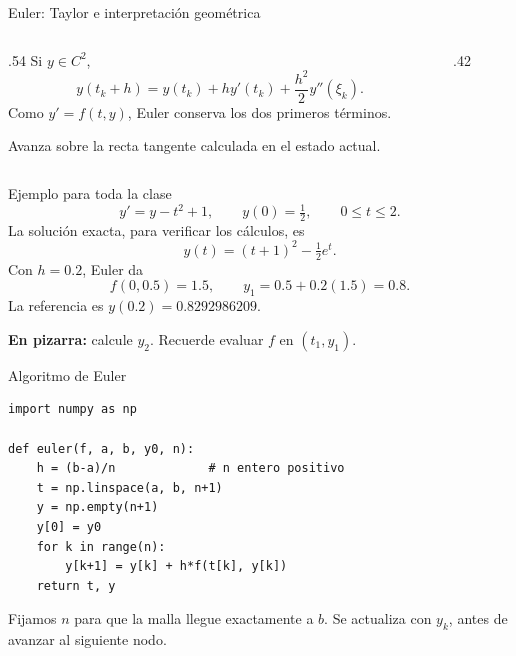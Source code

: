 \documentclass[aspectratio=169,12pt]{beamer}
\begin{document}
\begin{frame}{Euler: Taylor e interpretación geométrica}
\begin{columns}[c,onlytextwidth]
\begin{column}{.54\textwidth}
Si $y\in C^2$,
\[y(t_k+h)=y(t_k)+hy'(t_k)
+\frac{h^2}{2}y''(\xi_k).\]
Como $y'=f(t,y)$, Euler conserva los dos primeros términos.
\medskip

Avanza sobre la recta tangente calculada en el estado actual.
\end{column}
\begin{column}{.42\textwidth}
\end{column}
\end{columns}
\end{frame}

\begin{frame}{Ejemplo para toda la clase}
\[y'=y-t^2+1,\qquad y(0)=\tfrac12,\qquad 0\leq t\leq2.\]
La solución exacta, para verificar los cálculos, es
\[y(t)=(t+1)^2-\tfrac12 e^t.\]
Con $h=0.2$, Euler da
\[f(0,0.5)=1.5,\qquad y_1=0.5+0.2(1.5)=\boxed{0.8}.\]
La referencia es $y(0.2)=0.8292986209$.
\medskip

\textbf{En pizarra:} calcule $y_2$. Recuerde evaluar $f$ en $(t_1,y_1)$.
\end{frame}

\begin{frame}[fragile]{Algoritmo de Euler}
\begin{lstlisting}
import numpy as np

def euler(f, a, b, y0, n):
    h = (b-a)/n             # n entero positivo
    t = np.linspace(a, b, n+1)
    y = np.empty(n+1)
    y[0] = y0
    for k in range(n):
        y[k+1] = y[k] + h*f(t[k], y[k])
    return t, y
\end{lstlisting}
Fijamos $n$ para que la malla llegue exactamente a $b$.
Se actualiza con $y_k$, antes de avanzar al siguiente nodo.
\end{frame}
\end{document}
